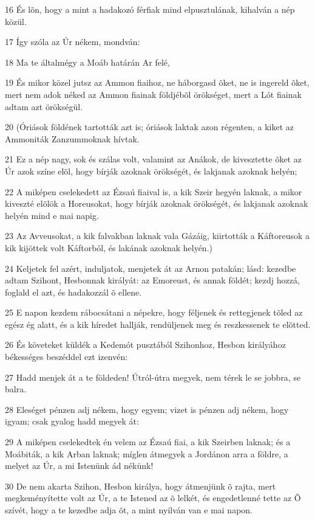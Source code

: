 \par 16 És lõn, hogy a mint a hadakozó férfiak mind elpusztulának, kihalván a nép közül.
\par 17 Így szóla az Úr nékem, mondván:
\par 18 Ma te általmégy a Moáb határán Ar felé,
\par 19 És mikor közel jutsz az Ammon fiaihoz, ne háborgasd õket, ne is ingereld õket, mert nem adok néked az Ammon fiainak földjébõl örökséget, mert a Lót fiainak adtam azt örökségül.
\par 20 (Óriások földének tartották azt is; óriások laktak azon régenten, a kiket az Ammoniták Zanzummoknak hívtak.
\par 21 Ez a nép nagy, sok és szálas volt, valamint az Anákok, de kivesztette õket az Úr azok színe elõl, hogy bírják azoknak örökségét, és lakjanak azoknak helyén;
\par 22 A miképen cselekedett az Ézsaú fiaival is, a kik Szeir hegyén laknak, a mikor kiveszté elõlök a Horeusokat, hogy bírják azoknak örökségét, és lakjanak azoknak helyén mind e mai napig.
\par 23 Az Avveusokat, a kik falvakban laknak vala Gázáig, kiirtották a Káftoreusok a kik kijöttek volt Káftorból, és lakának azoknak helyén.)
\par 24 Keljetek fel azért, induljatok, menjetek át az Arnon patakán; lásd: kezedbe adtam Szihont, Hesbonnak királyát: az Emoreust, és annak földét; kezdj hozzá, foglald el azt, és hadakozzál õ ellene.
\par 25 E napon kezdem rábocsátani a népekre, hogy féljenek és rettegjenek tõled az egész ég alatt, és a kik híredet hallják, rendüljenek meg és reszkessenek te elõtted.
\par 26 És követeket küldék a Kedemót pusztából Szihonhoz, Hesbon királyához békességes beszéddel ezt izenvén:
\par 27 Hadd menjek át a te földeden! Útról-útra megyek, nem térek le se jobbra, se balra.
\par 28 Eleséget pénzen adj nékem, hogy egyem; vizet is pénzen adj nékem, hogy igyam; csak gyalog hadd megyek át:
\par 29 A miképen cselekedtek én velem az Ézsaú fiai, a kik Szeirben laknak; és a Moábiták, a kik Arban laknak; míglen átmegyek a Jordánon arra a földre, a melyet az Úr, a mi Istenünk ád nékünk!
\par 30 De nem akarta Szihon, Hesbon királya, hogy átmenjünk õ rajta, mert megkeményítette volt az Úr, a te Istened az õ lelkét, és engedetlenné tette az Õ szívét, hogy a te kezedbe adja õt, a mint nyilván van e mai napon.
